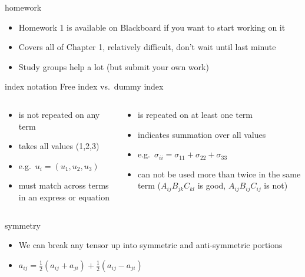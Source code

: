 \documentclass[
  letterpaper,
  ignorenonframetext,
  aspectratio=43,
  handout,
  12pt]{beamer}
\providecommand{\tightlist}{%
  \setlength{\itemsep}{0pt}\setlength{\parskip}{0pt}}
\providecommand{\tightlist}{%
\setlength{\itemsep}{0pt}\setlength{\parskip}{0pt}}
\begin{document}
\begin{frame}{homework}
\protect\hypertarget{homework}{}
\begin{itemize}
\tightlist
\item
  Homework 1 is available on Blackboard if you want to start working on
  it
\item
  Covers all of Chapter 1, relatively difficult, don't wait until last
  minute
\item
  Study groups help a lot (but submit your own work)
\end{itemize}
\end{frame}

\begin{frame}{index notation}
\protect\hypertarget{index-notation}{}
Free index vs.~dummy index

\begin{columns}[T]
\begin{column}{0.5\textwidth}
\begin{itemize}
\tightlist
\item
  is not repeated on any term
\item
  takes all values (1,2,3)
\item
  e.g.~\(u_i = (u_1, u_2, u_3)\)
\item
  must match across terms in an express or equation
\end{itemize}
\end{column}

\begin{column}{0.5\textwidth}
\begin{itemize}
\tightlist
\item
  is repeated on at least one term
\item
  indicates summation over all values
\item
  e.g.~\(\sigma_{ii} = \sigma_{11} + \sigma_{22} + \sigma_{33}\)
\item
  can not be used more than twice in the same term
  (\(A_{ij}B_{jk}C_{kl}\) is good, \(A_{ij}B_{ij}C_{ij}\) is not)
\end{itemize}
\end{column}
\end{columns}
\end{frame}

\begin{frame}{symmetry}
\protect\hypertarget{symmetry}{}
\begin{itemize}
\item
  We can break any tensor up into symmetric and anti-symmetric portions
\item
  \(a_{ij} = \frac{1}{2} (a_{ij} + a_{ji}) + \frac{1}{2} (a_{ij} - a_{ji})\)
\end{itemize}
\end{frame}
\end{document}
